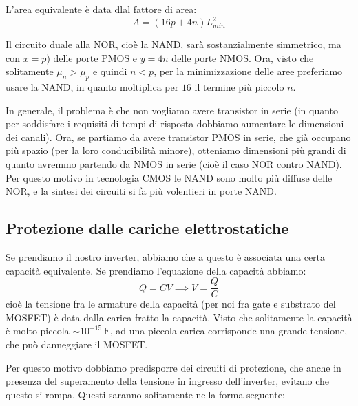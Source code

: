 \documentclass[a4paper,11pt]{article}
\begin{document}
L'area equivalente è data dlal fattore di area:
$$
A = (16 p + 4 n) L_{min}^2
$$

\par\smallskip

Il circuito duale alla NOR, cioè la NAND, sarà sostanzialmente simmetrico, ma con $x = p)$ delle porte PMOS e $y = 4n$ delle porte NMOS. Ora, visto che solitamente $\mu_n > \mu_p$ e quindi $n < p$, per la minimizzazione delle aree preferiamo usare la NAND, in quanto moltiplica per $16$ il termine più piccolo $n$.

In generale, il problema è che non vogliamo avere transistor in serie (in quanto per soddisfare i requisiti di tempi di risposta dobbiamo aumentare le dimensioni dei canali). Ora, se partiamo da avere transistor PMOS in serie, che già occupano più spazio (per la loro conducibilità minore), otteniamo dimensioni più grandi di quanto avremmo partendo da NMOS in serie (cioè il caso NOR contro NAND). Per questo motivo in tecnologia CMOS le NAND sono molto più diffuse delle NOR, e la sintesi dei circuiti si fa più volentieri in porte NAND. 

\subsection{Protezione dalle cariche elettrostatiche}
Se prendiamo il nostro inverter, abbiamo che a questo è associata una certa capacità equivalente. Se prendiamo l'equazione della capacità abbiamo:
$$
Q = CV \implies V = \frac{Q}{C}
$$
cioè la tensione fra le armature della capacità (per noi fra gate e substrato del MOSFET) è data dalla carica fratto la capacità. Visto che solitamente la capacità è molto piccola $\sim 10^{-15} \, \mathrm{F}$, ad una piccola carica corrisponde una grande tensione, che può danneggiare il MOSFET.

Per questo motivo dobbiamo predisporre dei circuiti di protezione, che anche in presenza del superamento della tensione in ingresso dell'inverter, evitano che questo si rompa. Questi saranno solitamente nella forma seguente:
\begin{center}
\end{center}
\end{document}
